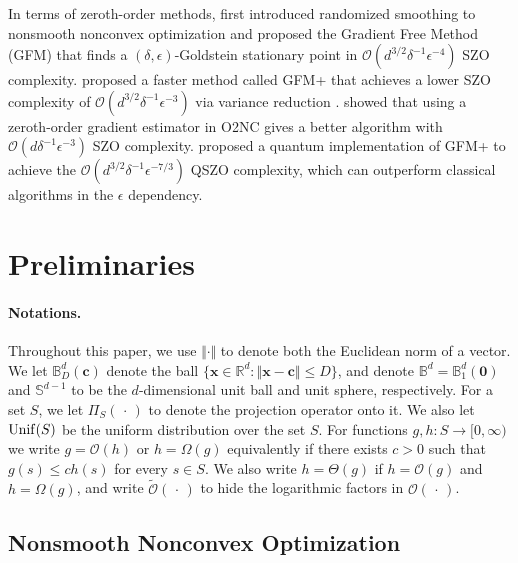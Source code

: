 \documentclass{article}
\def\vzero{{\bm{0}}}
\def\vc{{\bm{c}}}
\def\vx{{\bm{x}}}
\def\gO{{\mathcal{O}}}
\def\sB{{\mathbb{B}}}
\def\sR{{\mathbb{R}}}
\def\sS{{\mathbb{S}}}
\theoremstyle{definition}
\theoremstyle{remark}
\begin{document}
	In terms of zeroth-order methods,
	\citet{lin2022gradient} first introduced randomized smoothing \citep{duchi2012randomized} to nonsmooth nonconvex optimization and proposed the Gradient Free Method (GFM) that finds a $(\delta,\epsilon)$-Goldstein stationary point in $\gO(d^{3/2} \delta^{-1} \epsilon^{-4})$ SZO complexity. \citet{chen2023faster} proposed a faster method called GFM+ that achieves a lower SZO complexity of $\gO(d^{3/2} \delta^{-1} \epsilon^{-3})$ via variance reduction \citep{fang2018spider,cutkosky2019momentum,zhou2020stochastic}. \citet{kornowski2024algorithm} showed that using a zeroth-order gradient estimator \citep{shamir2017optimal} in O2NC \citep{cutkosky2023optimal} gives a better algorithm with  $\gO(d \delta^{-1} \epsilon^{-3})$ SZO complexity. \citet{liu2024quantum} proposed a quantum implementation of GFM+ to achieve the $\gO(d^{3/2} \delta^{-1} \epsilon^{-7/3})$ QSZO complexity, which can outperform classical algorithms in the $\epsilon$ dependency.
	
	
	\section{Preliminaries}
	
	\paragraph{Notations.} Throughout this paper, we use $\Vert \cdot \Vert$ to denote both the Euclidean norm of a vector.
	We let $\sB_D^d(\vc)$ denote the ball $ \{  \vx \in \sR^d : \Vert \vx - \vc \Vert \le D \}$, and denote $\sB^d = \sB_1^d(\vzero)$ and $\sS^{d-1}$ to be the $d$-dimensional unit ball and unit sphere, respectively. For a set $S$, we let $\Pi_S(\,\cdot\,)$ to denote the projection operator onto it. We also let ${\rm Unif}(S)$ be the uniform distribution over the set $S$.
	For functions $g, h :  S \rightarrow [0, \infty)$ we write $g = \gO(h)$ or $h = \Omega(g)$ equivalently if
	there exists $c > 0$ such that $g(s) \le c  h(s)$ for every $s \in S$. We also write 
	$h = \Theta(g)$ if $h = \gO(g) $ and $  h = \Omega(g)$, and write $\tilde \gO(\,\cdot\,)$ to hide the logarithmic factors in $\gO(\,\cdot\,)$.
	
	\subsection{Nonsmooth Nonconvex Optimization}
	
\end{document}
